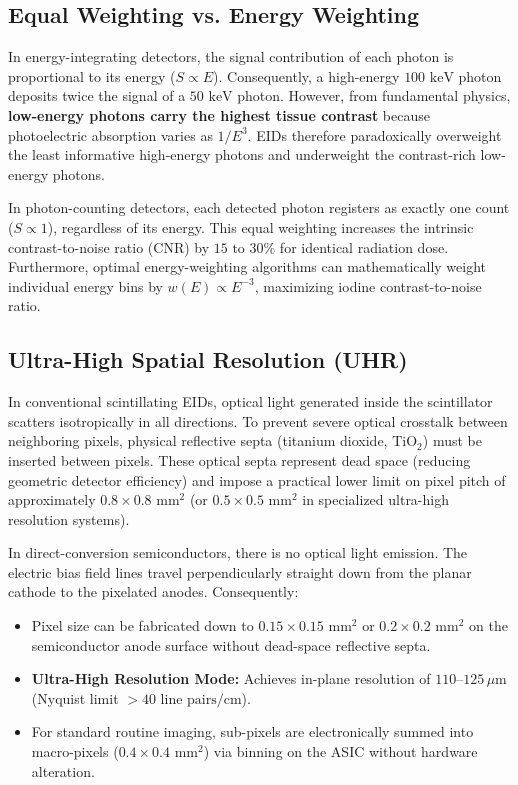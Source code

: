 \documentclass[11pt,a4paper]{article}
\begin{document}
\subsection{Equal Weighting vs. Energy Weighting}
In energy-integrating detectors, the signal contribution of each photon is proportional to its energy ($S \propto E$). Consequently, a high-energy $100\text{ keV}$ photon deposits twice the signal of a $50\text{ keV}$ photon. However, from fundamental physics, \textbf{low-energy photons carry the highest tissue contrast} because photoelectric absorption varies as $1/E^3$. EIDs therefore paradoxically overweight the least informative high-energy photons and underweight the contrast-rich low-energy photons.

In photon-counting detectors, each detected photon registers as exactly one count ($S \propto 1$), regardless of its energy. This equal weighting increases the intrinsic contrast-to-noise ratio (CNR) by $15\text{ to }30\%$ for identical radiation dose. Furthermore, optimal energy-weighting algorithms can mathematically weight individual energy bins by $w(E) \propto E^{-3}$, maximizing iodine contrast-to-noise ratio.

\subsection{Ultra-High Spatial Resolution (UHR)}
In conventional scintillating EIDs, optical light generated inside the scintillator scatters isotropically in all directions. To prevent severe optical crosstalk between neighboring pixels, physical reflective septa (titanium dioxide, $\text{TiO}_2$) must be inserted between pixels. These optical septa represent dead space (reducing geometric detector efficiency) and impose a practical lower limit on pixel pitch of approximately $0.8 \times 0.8\text{ mm}^2$ (or $0.5 \times 0.5\text{ mm}^2$ in specialized ultra-high resolution systems).

In direct-conversion semiconductors, there is no optical light emission. The electric bias field lines travel perpendicularly straight down from the planar cathode to the pixelated anodes. Consequently:
\begin{itemize}[leftmargin=2em]
    \item Pixel size can be fabricated down to \textbf{$0.15 \times 0.15\text{ mm}^2$} or \textbf{$0.2 \times 0.2\text{ mm}^2$} on the semiconductor anode surface without dead-space reflective septa.
    \item \textbf{Ultra-High Resolution Mode:} Achieves in-plane resolution of $110\text{--}125\,\mu\text{m}$ (Nyquist limit $> 40\text{ line pairs/cm}$).
    \item For standard routine imaging, sub-pixels are electronically summed into macro-pixels ($0.4 \times 0.4\text{ mm}^2$) via binning on the ASIC without hardware alteration.
\end{itemize}
\end{document}
